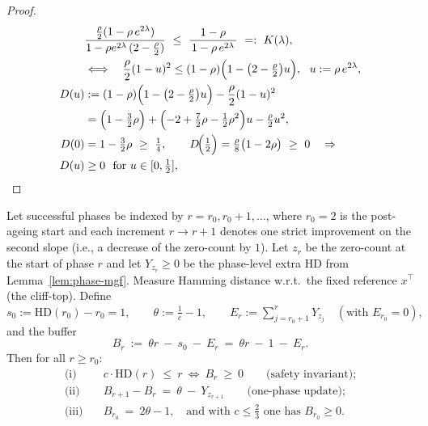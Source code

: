 \documentclass[lettersize,journal]{IEEEtran}
\newcommand{\HD}{\text{HD}}
\begin{document}
\begin{proof}
\begin{align*}
		&\frac{\tfrac{\rho}{2}(1-\rho\,e^{2\lambda})}{1-\rho e^{2\lambda}\,(2-\tfrac{\rho}{2})}
		\  \le\ \frac{1-\rho}{\,1-\rho\,e^{2\lambda}\,}
		\ =:\ K(\lambda),
		\\&\Longleftrightarrow\quad
		\frac{\rho}{2}(1-u)^2 \le (1-\rho)\Bigl(1-\bigl(2-\tfrac{\rho}{2}\bigr)u\Bigr),\ \ u:=\rho\,e^{2\lambda},
		\\
		D(u)
		&:=(1-\rho)\Bigl(1-\bigl(2-\tfrac{\rho}{2}\bigr)u\Bigr)-\frac{\rho}{2}(1-u)^2
		\\&= \Bigl(1-\tfrac{3}{2}\rho\Bigr)+\Bigl(-2+\tfrac{7}{2}\rho-\tfrac{1}{2}\rho^2\Bigr)u-\tfrac{\rho}{2}u^2,
		\\
		D(0)&=1-\tfrac{3}{2}\rho\ \ge\ \tfrac14,\qquad
		D\!\Big(\tfrac12\Big)=\tfrac{\rho}{8}\bigl(1-2\rho\bigr)\ \ge\ 0
		\quad\Rightarrow\quad \\
		D(u)&\ge 0\ \text{ for }u\in[0,\tfrac12],
	\end{align*}
	
	
\end{proof}

\begin{lemma}\label{lem:buffer}
	Let successful phases be indexed by $r=r_0,r_0+1,\dots$, where $r_0=2$ is the post-ageing start
	and each increment $r\!\to\! r\!+\!1$ denotes one strict improvement on the second slope (i.e., a decrease of the zero-count by $1$).
	Let $z_r$ be the zero-count at the start of phase $r$ and let $Y_{z_r}\ge 0$ be the phase-level extra HD from Lemma~\ref{lem:phase-mgf}.
	Measure Hamming distance w.r.t.\ the fixed reference $x^\top$ (the cliff-top).
	Define
	$
	s_0:=\HD(r_0)-r_0=1,\qquad
	\theta:=\frac{1}{c}-1,\qquad
	E_r:=\sum_{j=r_0+1}^{r} Y_{z_j}\quad(\text{with }E_{r_0}=0),
	$
	and the buffer
	\[
	B_r\ :=\ \theta r\ -\ s_0\ -\ E_r\ =\ \theta r\ -\ 1\ -\ E_r.
	\]
	Then for all $r\ge r_0$:
	\begin{align*}
		\text{(i)}\quad & c\cdot \HD(r)\ \le\ r\ \Longleftrightarrow\ B_r\ \ge\ 0
		\qquad\text{(safety invariant);}\\
		\text{(ii)}\quad & B_{r+1}-B_r\ =\ \theta\ -\ Y_{z_{r+1}}
		\qquad\text{(one-phase update);}\\
		\text{(iii)}\quad & B_{r_0}\ =\ 2\theta-1,\quad\text{and with }c\le\tfrac{2}{3}\text{ one has }B_{r_0}\ge 0.
	\end{align*}
\end{lemma}
\end{document}
